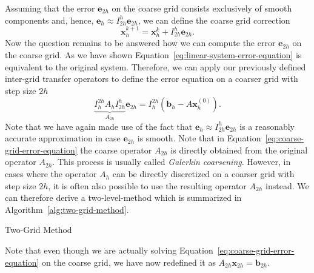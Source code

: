 Assuming that the error $\bm{e}_{2h}$ on the coarse grid consists exclusively of smooth components and, hence, $\bm{e}_{h} \approx I_{2h}^{h} \bm{e}_{2h}$, we can define the coarse grid correction 
\begin{equation}
	\bm{x}^{k+1}_h = \bm{x}^{k}_h + I_{2h}^h \bm{e}_{2h}.
\end{equation} 
Now the question remains to be answered how we can compute the error $\bm{e}_{2h}$ on the coarse grid.
As we have shown Equation~\eqref{eq:linear-system-error-equation} is equivalent to the original system.
Therefore, we can apply our previously defined inter-grid transfer operators to define the error equation on a coarser grid with step size $2h$
\begin{equation}
	\underbrace{I_{h}^{2h} A_h I_{2h}^h}_{A_{2h}} \bm{e}_{2h} = I_{h}^{2h} \left(\bm{b}_h - A \bm{x}^{(0)}_h\right).
	\label{eq:coarse-grid-error-equation}
\end{equation}
Note that we have again made use of the fact that $\bm{e}_{h} \approx I_{2h}^{h} \bm{e}_{2h}$ is a reasonably accurate approximation in case $\bm{e}_{2h}$ is smooth.
Note that in Equation~\eqref{eq:coarse-grid-error-equation} the coarse operator $A_{2h}$ is directly obtained from the original operator $A_{2h}$. 
This process is usually called \emph{Galerkin coarsening}.
However, in cases where the operator $A_h$ can be directly discretized on a coarser grid with step size $2h$, it is often also possible to use the resulting operator $A_{2h}$ instead.
We can therefore derive a two-level-method which is summarized in Algorithm~\ref{alg:two-grid-method}.
\begin{algorithm}
	\caption{Two-Grid Method}
	\label{alg:two-grid-method}
	\begin{algorithmic}
	\end{algorithmic}
\end{algorithm}
Note that even though we are actually solving Equation~\eqref{eq:coarse-grid-error-equation} on the coarse grid, we have now redefined it as $A_{2h} \bm{x}_{2h} = \bm{b}_{2h}$.

